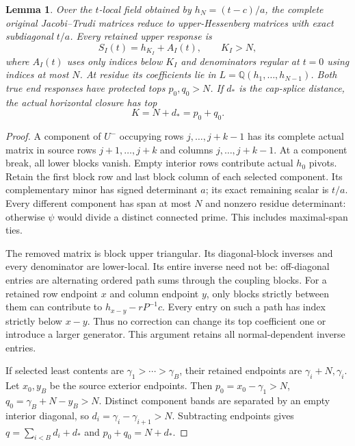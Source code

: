 \documentclass[11pt,a4paper]{amsart}
\numberwithin{equation}{section}
\theoremstyle{plain}
\newtheorem{lemma}[theorem]{Lemma}
\theoremstyle{definition}
\begin{document}
\begin{lemma}\label{lem:actual-elimination}
Over the \(t\)-local field obtained by \(h_N=(t-c)/a\), the complete original Jacobi--Trudi matrices reduce to upper-Hessenberg matrices with exact subdiagonal \(t/a\).  Every retained upper response is
\[
 S_I(t)=h_{K_I}+A_I(t),\qquad K_I>N,
\]
where \(A_I(t)\) uses only indices below \(K_I\) and denominators regular at \(t=0\) using indices at most \(N\).  At residue its coefficients lie in \(L=\mathbb Q(h_1,\ldots,h_{N-1})\).  Both true end responses have protected tops \(p_0,q_0>N\).  If \(d_*\) is the cap-splice distance, the actual horizontal closure has top
\[
 K=N+d_*=p_0+q_0.
\]
\end{lemma}
\begin{proof}
A component of \(U^-\) occupying rows \(j,\ldots,j+k-1\) has its complete actual matrix in source rows \(j+1,\ldots,j+k\) and columns \(j,\ldots,j+k-1\).  At a component break, all lower blocks vanish.  Empty interior rows contribute actual \(h_0\) pivots.  Retain the first block row and last block column of each selected component.  Its complementary minor has signed determinant \(a\); its exact remaining scalar is \(t/a\).  Every different component has span at most \(N\) and nonzero residue determinant: otherwise \(\psi\) would divide a distinct connected prime.  This includes maximal-span ties.

The removed matrix is block upper triangular.  Its diagonal-block inverses and every denominator are lower-local.  Its entire inverse need not be: off-diagonal entries are alternating ordered path sums through the coupling blocks.  For a retained row endpoint \(x\) and column endpoint \(y\), only blocks strictly between them can contribute to \(h_{x-y}-rP^{-1}c\).  Every entry on such a path has index strictly below \(x-y\).  Thus no correction can change its top coefficient one or introduce a larger generator.  This argument retains all normal-dependent inverse entries.

If selected least contents are \(\gamma_1>\cdots>\gamma_B\), their retained endpoints are \(\gamma_i+N,\gamma_i\).  Let \(x_0,y_B\) be the source exterior endpoints.  Then \(p_0=x_0-\gamma_1>N\), \(q_0=\gamma_B+N-y_B>N\).  Distinct component bands are separated by an empty interior diagonal, so \(d_i=\gamma_i-\gamma_{i+1}>N\).  Subtracting endpoints gives \(q=\sum_{i<B}d_i+d_*\) and \(p_0+q_0=N+d_*\).
\end{proof}
\end{document}
